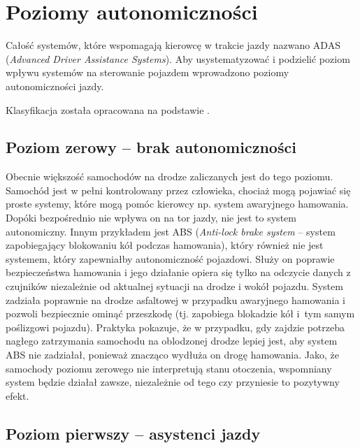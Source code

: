 \section{Poziomy autonomiczności}

Całość systemów, które wspomagają kierowcę w trakcie jazdy nazwano ADAS (\textit{Advanced Driver Assistance Systems}). 
Aby usystematyzować i podzielić poziom wpływu systemów na sterowanie pojazdem wprowadzono poziomy autonomiczności jazdy.



Klasyfikacja została opracowana na podstawie \cite{S3}. %

\subsection{Poziom zerowy -- brak autonomiczności}

Obecnie większość samochodów na drodze zaliczanych jest do tego poziomu. 
Samochód jest w pełni kontrolowany przez człowieka, chociaż mogą pojawiać się proste systemy, które mogą pomóc kierowcy np. system awaryjnego hamowania. 
Dopóki bezpośrednio nie wpływa on na tor jazdy, nie jest to system autonomiczny. 
Innym przykładem jest ABS (\textit{Anti-lock brake system} -- system zapobiegający blokowaniu kół podczas hamowania), który również nie jest systemem, który zapewniałby autonomiczność pojazdowi.
Służy on poprawie bezpieczeństwa hamowania i jego działanie opiera się tylko na odczycie danych z czujników niezależnie od aktualnej sytuacji na drodze i wokół pojazdu. 
System zadziała poprawnie na drodze asfaltowej w przypadku awaryjnego hamowania i pozwoli bezpiecznie ominąć przeszkodę (tj. zapobiega blokadzie kół i~tym samym poślizgowi pojazdu). 
Praktyka pokazuje, że w przypadku, gdy zajdzie potrzeba nagłego zatrzymania samochodu na oblodzonej drodze lepiej jest, aby system ABS nie zadziałał, ponieważ znacząco wydłuża on drogę hamowania. 
Jako, że samochody poziomu zerowego nie interpretują stanu otoczenia, wspomniany system będzie działał zawsze, niezależnie od tego czy przyniesie to pozytywny efekt. 


\subsection{Poziom pierwszy -- asystenci jazdy}

